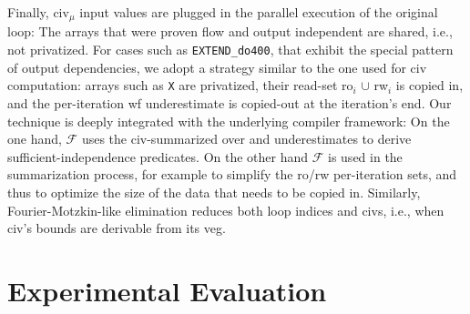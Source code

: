 \documentclass{sig-alternate}
\begin{document}
Finally, {\sc civ}$_\mu$ input values are plugged in the 
parallel execution of the original loop: The arrays that were proven flow and output
independent are shared, i.e., not privatized.   For cases such as {\tt EXTEND\_do400},
that exhibit the special pattern of output dependencies, we adopt a strategy similar
to the one used for {\sc civ} computation: arrays such as {\tt X} are privatized,
their read-set {\sc ro}$_i$ $\cup$ {\sc rw}$_i$ is copied in, and the per-iteration 
{\sc wf} underestimate
is copied-out at the iteration's end.   Our technique is deeply integrated with the
underlying compiler framework: On the one hand, $\mathcal{F}$ uses the {\sc civ}-summarized
over and underestimates to derive sufficient-independence predicates.
%
On the other hand $\mathcal{F}$ is used in the summarization process, for example 
to simplify the {\sc ro}/{\sc rw} per-iteration sets, and thus to optimize the 
size of the data that needs to be copied in.  Similarly, Fourier-Motzkin-like
elimination reduces both loop indices and {\sc civ}s, i.e., when {\sc civ}'s 
bounds are derivable from its {\sc veg}. %



\section{Experimental Evaluation}
\label{sec:EmpEval}
    
\end{document}
